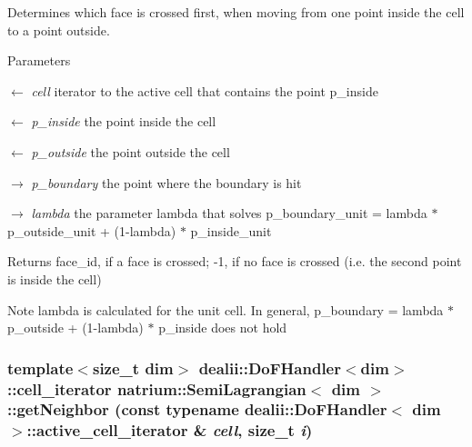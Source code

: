 Determines which face is crossed first, when moving from one point inside the cell to a point outside. 
\begin{DoxyParams}{Parameters}
\item[\mbox{$\leftarrow$} {\em cell}]iterator to the active cell that contains the point p\_\-inside \item[\mbox{$\leftarrow$} {\em p\_\-inside}]the point inside the cell \item[\mbox{$\leftarrow$} {\em p\_\-outside}]the point outside the cell \item[\mbox{$\rightarrow$} {\em p\_\-boundary}]the point where the boundary is hit \item[\mbox{$\rightarrow$} {\em lambda}]the parameter lambda that solves p\_\-boundary\_\-unit = lambda $\ast$ p\_\-outside\_\-unit + (1-\/lambda) $\ast$ p\_\-inside\_\-unit \end{DoxyParams}
\begin{DoxyReturn}{Returns}
face\_\-id, if a face is crossed; -\/1, if no face is crossed (i.e. the second point is inside the cell) 
\end{DoxyReturn}
\begin{DoxyNote}{Note}
lambda is calculated for the unit cell. In general, p\_\-boundary = lambda $\ast$ p\_\-outside + (1-\/lambda) $\ast$ p\_\-inside does not hold 
\end{DoxyNote}
\hypertarget{classnatrium_1_1SemiLagrangian_aac0394a8292810788e983909b2de4355}{
\subsubsection[{getNeighbor}]{\setlength{\rightskip}{0pt plus 5cm}template$<$size\_\-t dim$>$ dealii::DoFHandler$<$dim$>$::cell\_\-iterator {\bf natrium::SemiLagrangian}$<$ dim $>$::getNeighbor (const typename dealii::DoFHandler$<$ dim $>$::active\_\-cell\_\-iterator \& {\em cell}, \/  size\_\-t {\em i})}}
\label{classnatrium_1_1SemiLagrangian_aac0394a8292810788e983909b2de4355}


